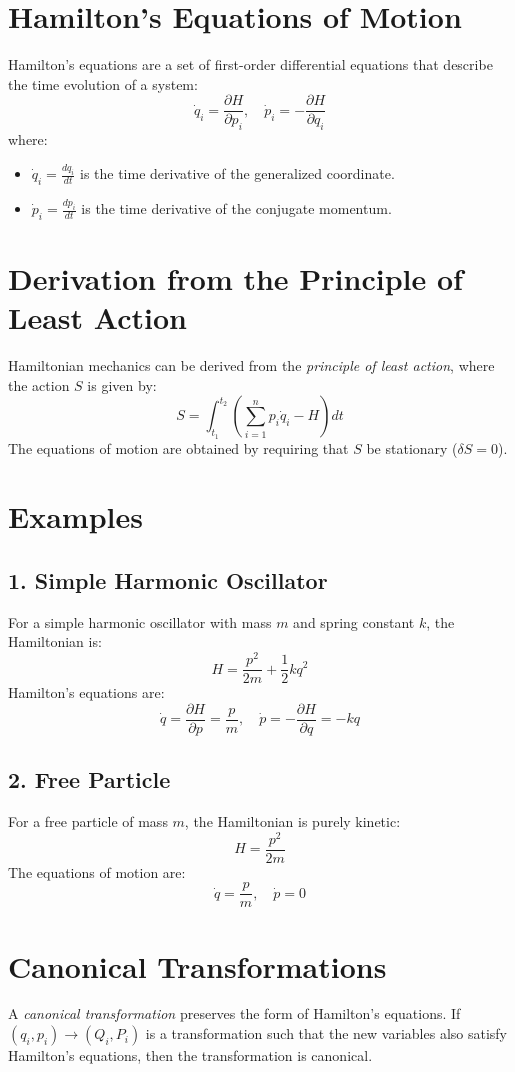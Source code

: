 \section{Hamilton's Equations of Motion}
Hamilton's equations are a set of first-order differential equations that describe the time evolution of a system:
\[
\dot{q}_i = \frac{\partial H}{\partial p_i}, \quad \dot{p}_i = -\frac{\partial H}{\partial q_i}
\]
where:
\begin{itemize}
    \item $\dot{q}_i = \frac{dq_i}{dt}$ is the time derivative of the generalized coordinate.
    \item $\dot{p}_i = \frac{dp_i}{dt}$ is the time derivative of the conjugate momentum.
\end{itemize}

\section{Derivation from the Principle of Least Action}
Hamiltonian mechanics can be derived from the \textit{principle of least action}, where the action $S$ is given by:
\[
S = \int_{t_1}^{t_2} \left( \sum_{i=1}^{n} p_i \dot{q}_i - H \right) dt
\]
The equations of motion are obtained by requiring that $S$ be stationary ($\delta S = 0$).

\section{Examples}
\subsection*{1. Simple Harmonic Oscillator}
For a simple harmonic oscillator with mass $m$ and spring constant $k$, the Hamiltonian is:
\[
H = \frac{p^2}{2m} + \frac{1}{2} k q^2
\]
Hamilton's equations are:
\[
\dot{q} = \frac{\partial H}{\partial p} = \frac{p}{m}, \quad \dot{p} = -\frac{\partial H}{\partial q} = -kq
\]

\subsection{2. Free Particle}
For a free particle of mass $m$, the Hamiltonian is purely kinetic:
\[
H = \frac{p^2}{2m}
\]
The equations of motion are:
\[
\dot{q} = \frac{p}{m}, \quad \dot{p} = 0
\]

\section{Canonical Transformations}
A \textit{canonical transformation} preserves the form of Hamilton's equations. If $(q_i, p_i) \to (Q_i, P_i)$ is a transformation such that the new variables also satisfy Hamilton's equations, then the transformation is canonical. 


